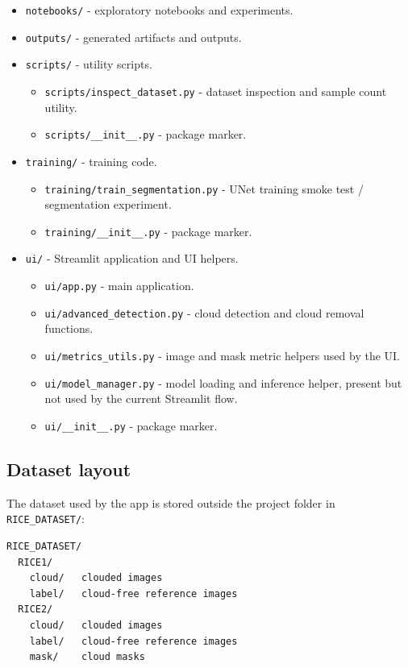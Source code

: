 \documentclass[11pt,a4paper]{article}
\begin{document}
\begin{itemize}
\begin{itemize}
    \item \verb|models/removal/| - currently empty scaffold.
    \item \verb|models/segmentation/__init__.py| - package marker.
  \end{itemize}
  \item \verb|notebooks/| - exploratory notebooks and experiments.
  \item \verb|outputs/| - generated artifacts and outputs.
  \item \verb|scripts/| - utility scripts.
  \begin{itemize}
    \item \verb|scripts/inspect_dataset.py| - dataset inspection and sample count utility.
    \item \verb|scripts/__init__.py| - package marker.
  \end{itemize}
  \item \verb|training/| - training code.
  \begin{itemize}
    \item \verb|training/train_segmentation.py| - UNet training smoke test / segmentation experiment.
    \item \verb|training/__init__.py| - package marker.
  \end{itemize}
  \item \verb|ui/| - Streamlit application and UI helpers.
  \begin{itemize}
    \item \verb|ui/app.py| - main application.
    \item \verb|ui/advanced_detection.py| - cloud detection and cloud removal functions.
    \item \verb|ui/metrics_utils.py| - image and mask metric helpers used by the UI.
    \item \verb|ui/model_manager.py| - model loading and inference helper, present but not used by the current Streamlit flow.
    \item \verb|ui/__init__.py| - package marker.
  \end{itemize}
\end{itemize}

\subsection{Dataset layout}
The dataset used by the app is stored outside the project folder in \verb|RICE_DATASET/|:
\begin{verbatim}
RICE_DATASET/
  RICE1/
    cloud/   clouded images
    label/   cloud-free reference images
  RICE2/
    cloud/   clouded images
    label/   cloud-free reference images
    mask/    cloud masks
\end{verbatim}
\end{document}
